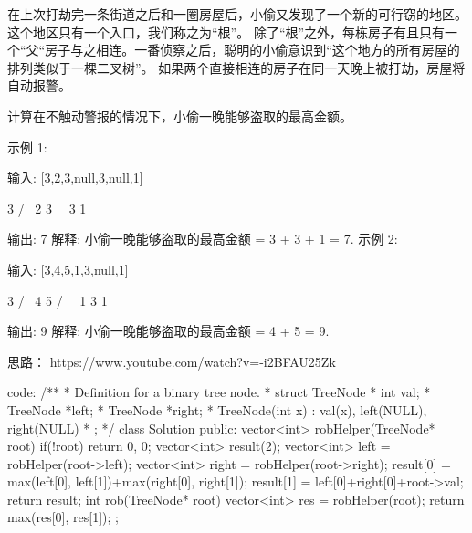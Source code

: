 在上次打劫完一条街道之后和一圈房屋后，小偷又发现了一个新的可行窃的地区。这个地区只有一个入口，我们称之为“根”。 除了“根”之外，每栋房子有且只有一个“父“房子与之相连。一番侦察之后，聪明的小偷意识到“这个地方的所有房屋的排列类似于一棵二叉树”。 如果两个直接相连的房子在同一天晚上被打劫，房屋将自动报警。

计算在不触动警报的情况下，小偷一晚能够盗取的最高金额。

示例 1:

输入: [3,2,3,null,3,null,1]

     3
    / \
   2   3
    \   \ 
     3   1

输出: 7 
解释: 小偷一晚能够盗取的最高金额 = 3 + 3 + 1 = 7.
示例 2:

输入: [3,4,5,1,3,null,1]

     3
    / \
   4   5
  / \   \ 
 1   3   1

输出: 9
解释: 小偷一晚能够盗取的最高金额 = 4 + 5 = 9.
























思路：
https://www.youtube.com/watch?v=-i2BFAU25Zk
































code:
/**
 * Definition for a binary tree node.
 * struct TreeNode {
 *     int val;
 *     TreeNode *left;
 *     TreeNode *right;
 *     TreeNode(int x) : val(x), left(NULL), right(NULL) {}
 * };
 */
class Solution {
public:
    vector<int> robHelper(TreeNode* root)
    {
        if(!root) return {0, 0};
        vector<int> result(2);
        vector<int> left = robHelper(root->left);
        vector<int> right = robHelper(root->right);
        result[0] = max(left[0], left[1])+max(right[0], right[1]);
        result[1] = left[0]+right[0]+root->val;
        return result;
    }
    int rob(TreeNode* root) {
        vector<int> res = robHelper(root);
        return max(res[0], res[1]);
    }
};